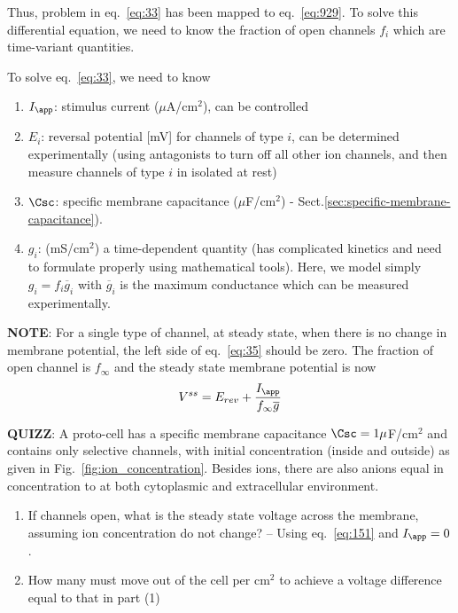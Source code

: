 Thus, problem in eq.~\eqref{eq:33} has been mapped to
eq.~\eqref{eq:929}. To solve this differential equation, we need to
know the fraction of open channels $f_i$ which are time-variant quantities.


To solve eq.~\eqref{eq:33}, we need to know
\begin{enumerate}
\item $I_\app$: stimulus current ($\mu$A/cm$^2$), can be controlled
\item $E_i$: reversal potential [mV] for channels of type $i$, can be
  determined experimentally (using antagonists to turn off all other
  ion channels, and then measure channels of type $i$ in isolated at
  rest)
\item $\Csc$: specific membrane capacitance ($\mu$F/cm$^2$) -
Sect.\ref{sec:specific-membrane-capacitance}).

\item $g_i$: (mS/cm$^2$) a time-dependent quantity (has complicated
  kinetics and need to formulate properly using mathematical tools). Here, we
  model simply $g_i = f_i \overline{g}_i$ with $\overline{g}_i$ is the maximum conductance
  which can be measured experimentally.
\end{enumerate}


{\bf NOTE}: For a single type of channel, at steady state, when there is no
change in membrane potential, the left side of eq.~\eqref{eq:35} should be zero.
 The fraction of open channel is $f_\infty$ and the steady state membrane
potential is now
\begin{equation}
  \label{eq:151}
  V^{ss} = E_{rev} + \frac{I_\app}{f_\infty\overline{g}}
\end{equation}

{\bf QUIZZ}: A proto-cell has a specific membrane capacitance
$\Csc=1\mu$F/cm$^2$ and contains only  selective channels, with initial
concentration (inside and outside) as given in Fig.~\ref{fig:ion_concentration}.
Besides  ions, there are also anions  equal in concentration to
 at both cytoplasmic and extracellular environment.

\begin{enumerate}
\item If  channels open, what is the steady state voltage
  across the membrane, assuming ion concentration do not change? --
  Using eq.~\eqref{eq:151} and  $I_\app = 0$.

\item How many  must move out of the cell per cm$^2$ to achieve
  a voltage difference equal to that in part (1)
\end{enumerate}


